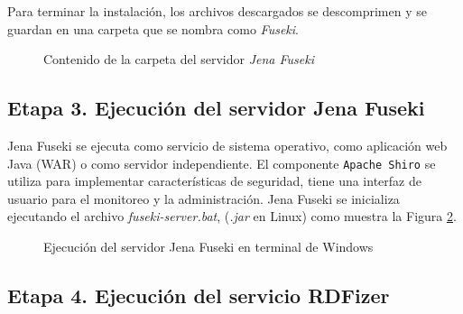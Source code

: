 Para terminar la instalaci\'on, los archivos descargados se descomprimen y se guardan en una carpeta que se nombra como \textit{Fuseki}. 

\begin{figure}[!ht]
	\centering
    \caption{Contenido de la carpeta del servidor \textit{Jena Fuseki}}
    \label{opcionesDescargaFuseki}
\end{figure}

\subsection{Etapa 3. Ejecuci\'on del servidor Jena Fuseki}

Jena Fuseki se ejecuta como servicio de sistema operativo, como aplicaci\'on web Java (WAR) o como servidor independiente. El componente \texttt{Apache Shiro} se utiliza para implementar caracter\'isticas de seguridad, tiene una interfaz de usuario para el monitoreo y la administraci\'on. Jena Fuseki se inicializa ejecutando el archivo \textit{fuseki-server.bat}, (\textit{.jar} en Linux) como muestra la Figura \ref{ejecucionFuseki}.

\begin{figure}[!ht]
	\centering
    \caption{Ejecuci\'on del servidor Jena Fuseki en terminal de Windows}
    \label{ejecucionFuseki}
\end{figure}

\subsection{Etapa 4. Ejecuci\'on del servicio RDFizer}

